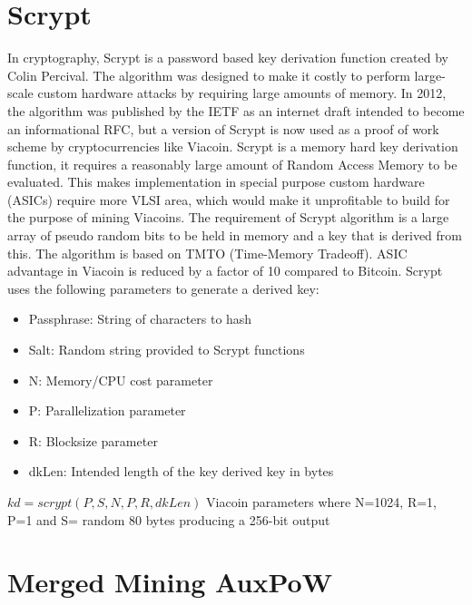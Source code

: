 \documentclass{article}
\begin{document}
\section{Scrypt}\label{sec: Scrypt}
In cryptography, \cite{scrypt}Scrypt is a password based key derivation function created by Colin Percival. The algorithm was designed to make it costly to perform large-scale custom hardware attacks by requiring large amounts of memory. In 2012, the algorithm was published by the IETF as an internet draft intended to become an informational RFC, but a version of Scrypt is now used as a proof of work scheme by cryptocurrencies like Viacoin. 
\newline \newline \noindent
Scrypt is a memory hard key derivation function, it requires a reasonably large amount of Random Access Memory to be evaluated.
This makes implementation in special purpose custom hardware (ASICs) require more VLSI area, which would make it unprofitable to build for the purpose of mining Viacoins. The requirement of Scrypt algorithm is a large array of pseudo random bits to be held in memory and a key that is derived from this. The algorithm is based on TMTO (Time-Memory Tradeoff). ASIC advantage in Viacoin is reduced by a factor of 10 compared to Bitcoin. 
\newline \newline \noindent
Scrypt uses the following parameters to generate a derived key:
\begin{itemize}
\item Passphrase: String of characters to hash
\item Salt: Random string provided to Scrypt functions
\item N: Memory/CPU cost parameter
\item P: Parallelization parameter
\item R: Blocksize parameter
\item dkLen: Intended length of the key derived key in bytes
\end{itemize}
$kd = scrypt(P, S, N, P, R, dkLen)$
\newline \newline \noindent
Viacoin parameters where N=1024, R=1, P=1 and S= random 80 bytes producing a 256-bit output

\section{Merged Mining AuxPoW}\label{sec:Merged Mining AuxPoW}
\end{document}
